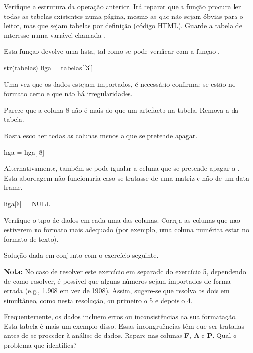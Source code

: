 \documentclass{exam}
\begin{document}
\begin{questions}
\question Verifique a estrutura da operação anterior. Irá reparar que a função  procura ler todas as tabelas existentes numa página, mesmo as que não sejam óbvias para o leitor, mas que sejam tabelas por definição (código HTML). Guarde a tabela de interesse numa variável chamada .

\begin{solution}
	Esta função devolve uma lista, tal como se pode verificar com a função .
	\begin{rcode}
		str(tabelas)
		liga = tabelas[[3]]
	\end{rcode}
\end{solution}

\question  Uma vez que os dados estejam importados, é necessário confirmar se estão no formato certo e que não há irregularidades.

Parece que a coluna 8 não é mais do que um artefacto na tabela. Remova-a da tabela.

\begin{solution}
	Basta escolher todas as colunas menos a que se pretende apagar.
	\begin{rcode}
		liga = liga[-8]
	\end{rcode}
	Alternativamente, também se pode igualar a coluna que se pretende apagar a . Esta abordagem não funcionaria caso se tratasse de uma matriz e não de um data frame.
	\begin{rcode}
		liga[8] = NULL
	\end{rcode}
\end{solution}

\question Verifique o tipo de dados em cada uma das colunas. Corrija as colunas que não estiverem no formato mais adequado (por exemplo, uma coluna numérica estar no formato de texto).

\begin{solution}
	Solução dada em conjunto com o exercício seguinte.
	
	\textbf{Nota:} No caso de resolver este exercício em separado do exercício 5, dependendo de como resolver, é possível que alguns números sejam importados de forma errada (e.g., 1.908 em vez de 1908). Assim, sugere-se que resolva os dois em simultâneo, como nesta resolução, ou primeiro o 5 e depois o 4.
\end{solution}

\question Frequentemente, os dados incluem erros ou inconsistências na sua formatação. Esta tabela é mais um exemplo disso. Essas incongruências têm que ser tratadas antes de se proceder à análise de dados. Repare nas colunas \textbf{F}, \textbf{A} e \textbf{P}. Qual o problema que identifica?


\end{questions}
\end{document}
